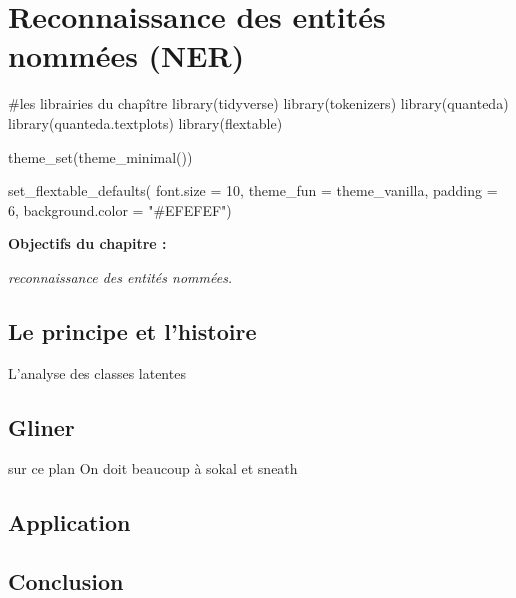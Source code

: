 \documentclass[
  letterpaper,
  DIV=11,
  numbers=noendperiod]{scrreprt}
\newenvironment{Shaded}{\begin{snugshade}}{\end{snugshade}}
\newcommand{\AttributeTok}[1]{\textcolor[rgb]{0.40,0.45,0.13}{#1}}
\newcommand{\CommentTok}[1]{\textcolor[rgb]{0.37,0.37,0.37}{#1}}
\newcommand{\DecValTok}[1]{\textcolor[rgb]{0.68,0.00,0.00}{#1}}
\newcommand{\FunctionTok}[1]{\textcolor[rgb]{0.28,0.35,0.67}{#1}}
\newcommand{\NormalTok}[1]{\textcolor[rgb]{0.00,0.23,0.31}{#1}}
\newcommand{\StringTok}[1]{\textcolor[rgb]{0.13,0.47,0.30}{#1}}
\begin{document}

\chapter{Reconnaissance des entités nommées
(NER)}\label{reconnaissance-des-entituxe9s-nommuxe9es-ner}

\begin{Shaded}
\begin{Highlighting}[]
\CommentTok{\#les librairies du chapître}
\FunctionTok{library}\NormalTok{(tidyverse)}
\FunctionTok{library}\NormalTok{(tokenizers)}
\FunctionTok{library}\NormalTok{(quanteda)}
\FunctionTok{library}\NormalTok{(quanteda.textplots)}
\FunctionTok{library}\NormalTok{(flextable)}

\FunctionTok{theme\_set}\NormalTok{(}\FunctionTok{theme\_minimal}\NormalTok{()) }

\FunctionTok{set\_flextable\_defaults}\NormalTok{(}
  \AttributeTok{font.size =} \DecValTok{10}\NormalTok{, }\AttributeTok{theme\_fun =}\NormalTok{ theme\_vanilla,}
  \AttributeTok{padding =} \DecValTok{6}\NormalTok{,}
  \AttributeTok{background.color =} \StringTok{"\#EFEFEF"}\NormalTok{)}
\end{Highlighting}
\end{Shaded}

\textbf{Objectifs du chapitre :}

\emph{reconnaissance des entités nommées.}

\section{Le principe et l'histoire}\label{le-principe-et-lhistoire}

L'analyse des classes latentes

\section{Gliner}\label{gliner}

sur ce plan On doit beaucoup à sokal et sneath

\section{Application}\label{application-2}

\section{Conclusion}\label{conclusion-13}
\end{document}
